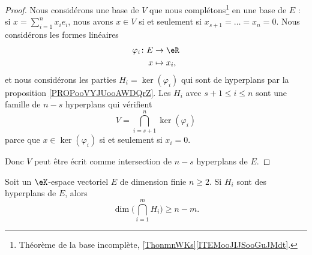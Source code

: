 \begin{proof}
	Nous considérons une base de \( V\) que nous complétons\footnote{Théorème de la base incomplète, \ref{ThonmnWKs}\ref{ITEMooJIJSooGuJMdt}.} en une base de \( E\) : si \( x=\sum_{i=1}^nx_ie_i\), nous avons \( x\in V\) si et seulement si \( x_{s+1}=\ldots=x_n=0\). Nous considérons les formes linéaires
	\begin{equation}
		\begin{aligned}
			\varphi_i\colon E & \to \eR      \\
			x                 & \mapsto x_i,
		\end{aligned}
	\end{equation}
	et nous considérons les parties \( H_i=\ker(\varphi_i)\) qui sont de hyperplans par la proposition \ref{PROPooVYJUooAWDQrZ}. Les \( H_i\) avec \( s+1\leq i\leq n\) sont une famille de \( n-s\) hyperplans qui vérifient
	\begin{equation}
		V=\bigcap_{i=s+1}^n\ker(\varphi_i)
	\end{equation}
	parce que \( x\in \ker(\varphi_i)\) si et seulement si \( x_i=0\).

	Donc \( V\) peut être écrit comme intersection de \( n-s\) hyperplans de \( E\).
\end{proof}

\begin{proposition}      \label{PROPooRCLNooJpIMMl}
	Soit un \( \eK\)-espace vectoriel \( E\) de dimension finie \( n\geq 2\). Si \( H_i\) sont des hyperplans de \( E\), alors
	\begin{equation}
		\dim\Big( \bigcap_{i=1}^mH_i \Big)\geq n-m.
	\end{equation}
\end{proposition}


